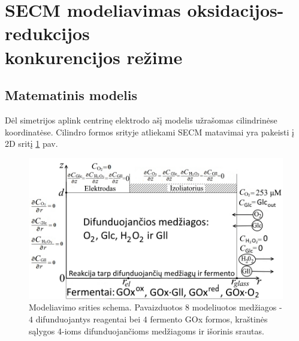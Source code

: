 



\section[SECM modeliavimas oksidacijos-redukcijos konkurencijos režime]{SECM modeliavimas oksidacijos-re\-duk\-ci\-jos\\ konkurencijos režime}
\label{sec:santr_reakc}



\subsection{Matematinis modelis}

Dėl simetrijos aplink centrinę elektrodo ašį modelis užrašomas cilindrinėse koordinatėse. Cilindro formos srityje atliekami SECM matavimai yra pakeisti į 2D sritį \ref{fig:santr_Domain} pav.


\begin{figure}[ht!]
\centering
\includegraphics[width=0.8\linewidth]{summary/Model_domainLT.png}
\caption{Modeliavimo srities schema. Pavaizduotos $8$ modeliuotos medžiagos - $4$ difunduojantys reagentai bei $4$ fermento GOx formos, kraštinės sąlygos 4-ioms difunduojančioms medžiagoms ir išorinis srautas.}
\label{fig:santr_Domain}
\end{figure}

